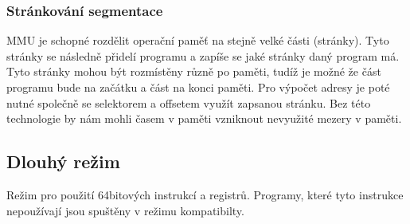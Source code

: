 \subsubsection{Stránkování segmentace}
MMU je schopné rozdělit operační paměť na stejně velké části (stránky).
Tyto stránky se následně přidelí programu a zapíše se jaké stránky daný program má.
Tyto stránky mohou být rozmístěny různě po paměti, tudíž je možné že část programu bude na začátku a část na konci paměti.
Pro výpočet adresy je poté nutné společně se selektorem a offsetem využít zapsanou stránku.
Bez této technologie by nám mohli časem v paměti vzniknout nevyužité mezery v paměti.

\subsection{Dlouhý režim}
Režim pro použití 64bitových instrukcí a registrů.
Programy, které tyto instrukce nepoužívají jsou spuštěny v režimu kompatibilty.
